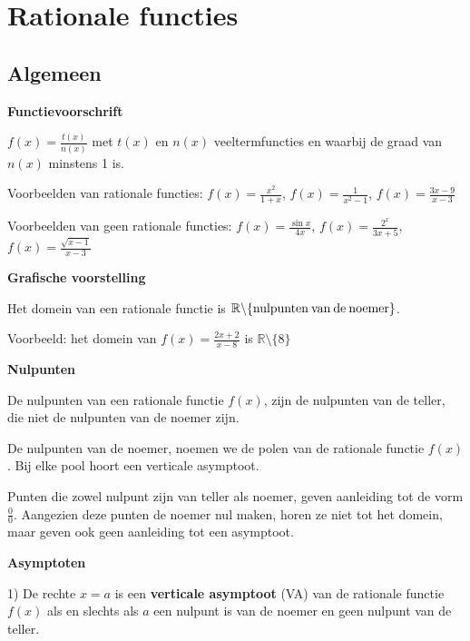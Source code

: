 \section{Rationale functies}

\subsection{Algemeen}

\textbf{Functievoorschrift}

${\displaystyle f(x)=\frac{t(x)}{n(x)}}$ met $t(x)$ en $n(x)$ veeltermfuncties
en waarbij de graad van $n(x)$ minstens 1 is.

\noindent Voorbeelden van rationale functies: ${\displaystyle f(x)=\frac{x^{2}}{1+x}}$,
${\displaystyle f(x)=\frac{1}{x^{2}-1}}$, ${\displaystyle f(x)=\frac{3x-9}{x-3}}$

\noindent Voorbeelden van geen rationale functies: ${\displaystyle f(x)=\frac{\sin x}{4x}}$,
${\displaystyle f(x)=\frac{2^{x}}{3x+5}}$, ${\displaystyle f(x)=\frac{\sqrt{x-1}}{x-3}}$

\medskip{}


\noindent \textbf{Grafische voorstelling}

Het domein van een rationale functie is $\mathbb{R\setminus}\textrm{\{nulpunten\:van\:de\:noemer\}}$.

Voorbeeld: het domein van ${\displaystyle f(x)=\frac{2x+2}{x-8}}$
is ${\displaystyle \mathbb{R}\setminus\{8\}}$

\medskip{}


\noindent \textbf{Nulpunten}

De nulpunten van een rationale functie $f(x)$, zijn de nulpunten
van de teller, die niet de nulpunten van de noemer zijn.

De nulpunten van de noemer, noemen we de polen van de rationale functie
$f(x)$. Bij elke pool hoort een verticale asymptoot.

\medskip{}


Punten die zowel nulpunt zijn van teller als noemer, geven aanleiding
tot de vorm $\frac{0}{0}$. Aangezien deze punten de noemer nul maken,
horen ze niet tot het domein, maar geven ook geen aanleiding tot een
asymptoot.\medskip{}


\noindent \textbf{Asymptoten}

1) De rechte $x=a$ is een \textbf{verticale asymptoot} (VA) van de
rationale functie $f(x)$ als en slechts als $a$ een nulpunt is van
de noemer en geen nulpunt van de teller.

